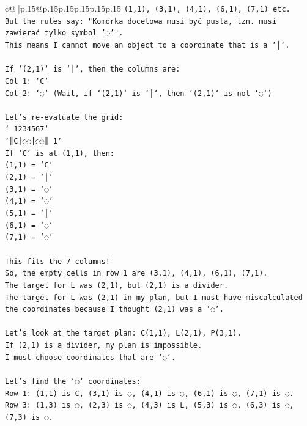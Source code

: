\documentclass{article}
\begin{document}
{\begin{supertabular}{c@{$\;$}|p{.15\linewidth}@{}p{.15\linewidth}p{.15\linewidth}p{.15\linewidth}p{.15\linewidth}p{.15\linewidth}}
{{{\texttt{(1,1), (3,1), (4,1), (6,1), (7,1) etc.} \\
\texttt{But the rules say: "Komórka docelowa musi być pusta, tzn. musi zawierać tylko symbol '◌'".} \\
\texttt{This means I cannot move an object to a coordinate that is a `│`.} \\
\\ 
\texttt{If `(2,1)` is `│`, then the columns are:} \\
\texttt{Col 1: `C`} \\
\texttt{Col 2: `◌` (Wait, if `(2,1)` is `│`, then `(2,1)` is not `◌`)} \\
\\ 
\texttt{Let's re{-}evaluate the grid:} \\
\texttt{` 1234567`} \\
\texttt{`║C│◌◌│◌◌║ 1`} \\
\texttt{If `C` is at (1,1), then:} \\
\texttt{(1,1) = `C`} \\
\texttt{(2,1) = `│`} \\
\texttt{(3,1) = `◌`} \\
\texttt{(4,1) = `◌`} \\
\texttt{(5,1) = `│`} \\
\texttt{(6,1) = `◌`} \\
\texttt{(7,1) = `◌`} \\
\\ 
\texttt{This fits the 7 columns!} \\
\texttt{So, the empty cells in row 1 are (3,1), (4,1), (6,1), (7,1).} \\
\texttt{The target for L was (2,1), but (2,1) is a divider.} \\
\texttt{The target for L was (2,1) in my plan, but I must have miscalculated the coordinates because I thought (2,1) was a `◌`.} \\
\\ 
\texttt{Let's look at the target plan: C(1,1), L(2,1), P(3,1).} \\
\texttt{If (2,1) is a divider, my plan is impossible.} \\
\texttt{I must choose coordinates that are `◌`.} \\
\\ 
\texttt{Let's find the `◌` coordinates:} \\
\texttt{Row 1: (1,1) is C, (3,1) is ◌, (4,1) is ◌, (6,1) is ◌, (7,1) is ◌.} \\
\texttt{Row 3: (1,3) is ◌, (2,3) is ◌, (4,3) is L, (5,3) is ◌, (6,3) is ◌, (7,3) is ◌.} \\
}}}
\end{supertabular}}
\end{document}
